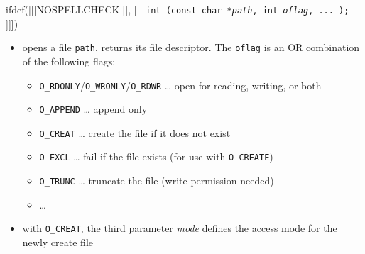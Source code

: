 

\begin{slide}
ifdef([[[NOSPELLCHECK]]], [[[
\texttt{int (const char *\emph{path}, int \emph{oflag},
... );}
]]])
\begin{itemize}
\item opens a file \texttt{path}, returns its file descriptor. The
\texttt{oflag} is an OR combination of the following flags:
    \begin{itemize}
    \item \texttt{O\_RDONLY}/\texttt{O\_WRONLY}/\texttt{O\_RDWR} \dots{}
    open for reading, writing, or both
    \item \texttt{O\_APPEND} \dots{} append only
    \item \texttt{O\_CREAT} \dots{} create the file if it does not exist
    \item \texttt{O\_EXCL} \dots{} fail if the file exists (for use with
    \texttt{O\_CREATE})
    \item \texttt{O\_TRUNC} \dots{} truncate the file (write permission
    needed)
    \item \dots{}
    \end{itemize}
\item with \texttt{O\_CREAT}, the third parameter \emph{mode}
defines the access mode for the newly create file
\end{itemize}
\end{slide}


